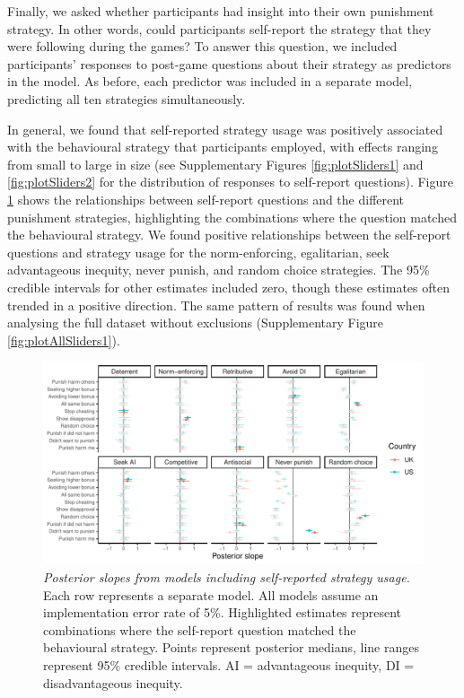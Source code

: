 \documentclass[
  man, donotrepeattitle,floatsintext]{apa6}
\begin{document}
Finally, we asked whether participants had insight into their own punishment
strategy. In other words, could participants self-report the strategy that they
were following during the games? To answer this question, we included
participants' responses to post-game questions about their strategy as
predictors in the model. As before, each predictor was included in a separate
model, predicting all ten strategies simultaneously.

In general, we found that self-reported strategy usage was positively associated
with the behavioural strategy that participants employed, with effects ranging
from small to large in size (see Supplementary Figures \ref{fig:plotSliders1}
and \ref{fig:plotSliders2} for the distribution of responses to self-report
questions). Figure \ref{fig:plotAllSliders2} shows the relationships between
self-report questions and the different punishment strategies, highlighting the
combinations where the question matched the behavioural strategy. We found
positive relationships between the self-report questions and strategy usage for
the norm-enforcing, egalitarian, seek advantageous inequity, never punish, and
random choice strategies. The 95\% credible intervals for other estimates
included zero, though these estimates often trended in a positive direction. The
same pattern of results was found when analysing the full dataset without
exclusions (Supplementary Figure \ref{fig:plotAllSliders1}).








\begin{figure}
\centering
\includegraphics{manuscript_files/figure-latex/plotAllSliders2-1.pdf}
\caption{\label{fig:plotAllSliders2}\emph{Posterior slopes from models including
self-reported strategy usage.} Each row represents a separate model. All models
assume an implementation error rate of 5\%. Highlighted estimates represent
combinations where the self-report question matched the behavioural strategy.
Points represent posterior medians, line ranges represent 95\% credible
intervals. AI = advantageous inequity, DI = disadvantageous inequity.}
\end{figure}
\end{document}
